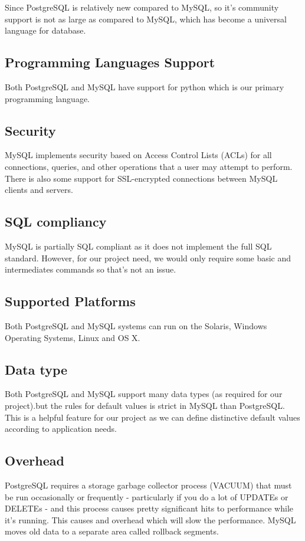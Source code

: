 \documentclass{article}
\begin{document}
Since PostgreSQL is relatively new compared to MySQL, so it’s community support is not as large as compared to MySQL, which has become a universal language for database.

\subsection{Programming Languages Support}

Both PostgreSQL and MySQL have support for python which is our primary programming language.

\subsection{Security}

MySQL implements security based on Access Control Lists (ACLs) for all connections, queries, and other operations that a user may attempt to perform. There is also some support for SSL-encrypted connections between MySQL clients and servers.

\subsection{SQL compliancy}

MySQL is partially SQL compliant as it does not implement the full SQL standard. However, for our project need, we would only require some basic and intermediates commands so that’s not an issue.


\subsection{Supported Platforms}

Both PostgreSQL and MySQL systems can run on the Solaris, Windows Operating Systems, Linux and OS X. 

\subsection{Data type}
Both PostgreSQL and MySQL support many data types (as required for our project).but the rules for default values is strict in MySQL than PostgreSQL. This is a helpful feature for our project as we can define distinctive default values according to application needs.

\subsection{Overhead}PostgreSQL requires a storage garbage collector process (VACUUM) that must be run occasionally or frequently - particularly if you do a lot of UPDATEs or DELETEs - and this process causes pretty significant hits to performance while it's running. This causes and overhead which will slow the performance. MySQL moves old data to a separate area called rollback segments.
\end{document}
